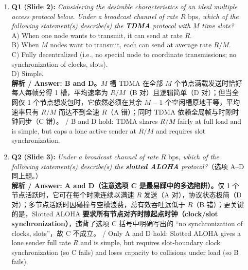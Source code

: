 \begin{enumerate}
\item \textbf{Q1 (Slide 2):} \emph{Considering the desirable characteristics of an ideal multiple access protocol below. Under a broadcast channel of rate $R\text{ bps}$, which of the following statement(s) describe(s) the \textbf{TDMA} protocol with $M$ time slots?} \\
A) When one node wants to transmit, it can send at rate $R$. \\
B) When $M$ nodes want to transmit, each can send at average rate $R/M$. \\
C) Fully decentralized (i.e., no special node to coordinate transmissions; no synchronization of clocks, slots). \\
D) Simple. \\
\textbf{解析 / Answer: B and D。}$M$ 槽 TDMA 在全部 $M$ 个节点满载发送时恰好每人每帧分得 1 槽，平均速率为 $R/M$（B 对）且逻辑简单（D 对）；但当全网仅 1 个节点想发包时，它依然必须在其余 $M-1$ 个空闲槽原地干等，平均速率只有 $R/M$ 而达不到全速 $R$（A 错）；同时 TDMA 依赖全局帧与时隙时钟同步（C 错）。 / B and D hold: TDMA shares $R/M$ fairly at full load and is simple, but caps a lone active sender at $R/M$ and requires slot synchronization.

\item \textbf{Q2 (Slide 3):} \emph{Under a broadcast channel of rate $R\text{ bps}$, which of the following statement(s) describe(s) the \textbf{slotted ALOHA} protocol?}（选项 A–D 同上题。） \\
\textbf{解析 / Answer: A and D（注意选项 C 是最易踩中的多选陷阱）。}仅 1 个节点活跃时，它可在每个时隙连续以满速 $R$ 发送（A 对），协议状态极简（D 对）；多节点活跃时因碰撞与空槽浪费，总有效吞吐远低于 $R$（B 错）；更关键的是，Slotted ALOHA \textbf{要求所有节点对齐时隙起点时钟（clock/slot synchronization）}，违背了选项 C 括号中明确写出的 ``no synchronization of clocks, slots''，故 C 不成立。 / Only A and D hold: Slotted ALOHA gives a lone sender full rate $R$ and is simple, but requires slot-boundary clock synchronization (so C fails) and loses capacity to collisions under load (so B fails).


\end{enumerate}
